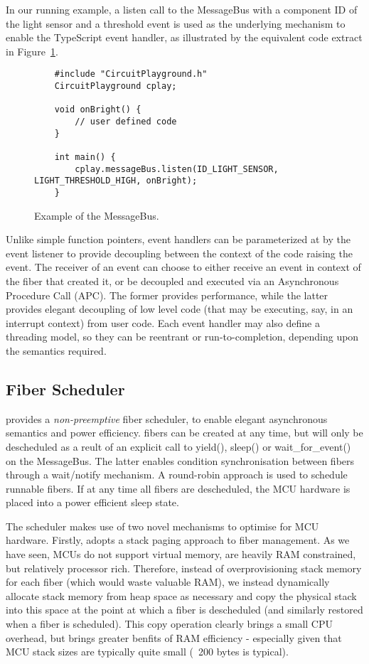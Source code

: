 In our running example, a listen call to the MessageBus with a component ID of the light sensor and a threshold event is used as the underlying mechanism to enable the TypeScript event handler, as illustrated by the equivalent \CO code extract in Figure~\ref{fig:messageBus}.

\begin{figure}
    \begin{lstlisting}
    #include "CircuitPlayground.h"
    CircuitPlayground cplay;

    void onBright() {
        // user defined code
    }

    int main() {
        cplay.messageBus.listen(ID_LIGHT_SENSOR, LIGHT_THRESHOLD_HIGH, onBright);
    }
    \end{lstlisting}
    \caption{\label{fig:messageBus}Example of the \CO MessageBus.}
\end{figure}

Unlike simple function pointers, \CO event handlers can be parameterized at by the event listener to provide decoupling between the context of the code raising the event. The receiver of an event can choose to either receive an event in context of the fiber that created it, or be decoupled and executed via an Asynchronous Procedure Call (APC). The former provides performance, while the latter provides elegant decoupling of low level code (that may be executing, say, in an interrupt context) from user code. Each event handler may also define a threading model, so they can be reentrant or run-to-completion, depending upon the semantics required.

\subsection{Fiber Scheduler}
\CO provides a \emph{non-preemptive} fiber scheduler, to enable elegant asynchronous semantics and power efficiency. \CO fibers can be created at any time, but will only be descheduled as a reult of an explicit call to yield(), sleep() or wait\_for\_event() on the MessageBus. The latter enables condition synchronisation between fibers through a wait/notify mechanism. A round-robin approach is used to schedule runnable fibers. If at any time all fibers are descheduled, the MCU hardware is placed into a power efficient sleep state.

The \CO scheduler makes use of two novel mechanisms to optimise for MCU hardware. Firstly, \CO adopts a stack paging approach to fiber management. As we have seen, MCUs do not support virtual memory, are heavily RAM constrained, but relatively processor rich. Therefore, instead of overprovisioning stack memory for each fiber (which would waste valuable RAM), we instead dynamically allocate stack memory from heap space as necessary and copy the physical stack into this space at the point at which a fiber is descheduled (and similarly restored when a fiber is scheduled). This copy operation clearly brings a small CPU overhead, but brings greater benfits of RAM efficiency - especially given that MCU stack sizes are typically quite small (~200 bytes is typical).

